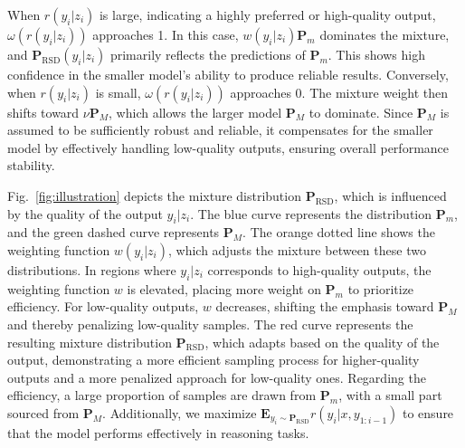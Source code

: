 \documentclass{article}
\theoremstyle{plain}
\theoremstyle{definition}
\theoremstyle{remark}
\begin{document}
When \(r(y_i | z_i)\) is large, indicating a highly preferred or high-quality output, \(\omega(r(y_i | z_i))\) approaches 1. In this case, \(w(y_i | z_i) \mathbf{P}_m\) dominates the mixture, and \(\mathbf{P}_{\text{RSD}}(y_i | z_i)\) primarily reflects the predictions of \(\mathbf{P}_m\). This shows high confidence in the smaller model's ability to produce reliable results.
   Conversely, when \(r(y_i | z_i)\) is small, \(\omega(r(y_i | z_i))\) approaches 0. The mixture weight then shifts toward \(\nu \mathbf{P}_M\), which allows the larger model \(\mathbf{P}_M\) to dominate. Since \(\mathbf{P}_M\) is assumed to be sufficiently robust and reliable, it compensates for the smaller model by effectively handling low-quality outputs, ensuring overall performance stability.





 Fig.~\ref{fig:illustration} depicts the mixture distribution \(\mathbf{P}_{\text{RSD}}\), which is influenced by the quality of the output \(y_i | z_i\). The blue curve represents the distribution \(\mathbf{P}_m\), and the green dashed curve represents \(\mathbf{P}_M\). The orange dotted line shows the weighting function \(w(y_i | z_i)\), which adjusts the mixture between these two distributions. In regions where \(y_i | z_i\) corresponds to high-quality outputs, the weighting function \(w\) is elevated, placing more weight on \(\mathbf{P}_m\) to prioritize efficiency. For low-quality outputs, \(w\) decreases, shifting the emphasis toward \(\mathbf{P}_M\) and thereby penalizing low-quality samples. The red curve represents the resulting mixture distribution \(\mathbf{P}_{\text{RSD}}\), which adapts based on the quality of the output, demonstrating a more efficient sampling process for higher-quality outputs and a more penalized approach for low-quality ones. Regarding the efficiency, a large proportion of samples are drawn from \( \mathbf{P}_m \), with a small part sourced from \( \mathbf{P}_M \). Additionally, we maximize \( \mathbf{E}_{y_i \sim \mathbf{P}_{\text{RSD}}} r(y_i|x, y_{1:i-1}) \) to ensure that the model performs effectively in reasoning tasks.



\end{document}
